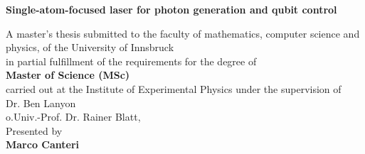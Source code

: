 
\begin{titlepage}


 \thispagestyle{frontpage}

 \begin{center}

   \vspace*{6\baselineskip}


   {\Huge \textbf{Single-atom-focused laser for photon generation and qubit control\\}}



       \vspace*{1,5\baselineskip}


   \vspace{1,5\baselineskip}

   \large{A master’s thesis submitted to the faculty of mathematics, computer science and physics, of the University of Innsbruck\\ in partial fulfillment of the requirements for the degree of\\\vspace{1,2\baselineskip}\textbf{Master of Science (MSc)} \\\vspace{1,2\baselineskip}carried out at the Institute of Experimental Physics under the supervision of}\\
   \large{Dr. Ben Lanyon}\\
   \large{o.Univ.-Prof.  Dr.  Rainer Blatt,}\\
    \vspace{1,2\baselineskip}
   \large{Presented by\\}
   \huge{\textbf{Marco Canteri}}\\
   \vfill
   \large{ }

 \end{center}

\end{titlepage}

